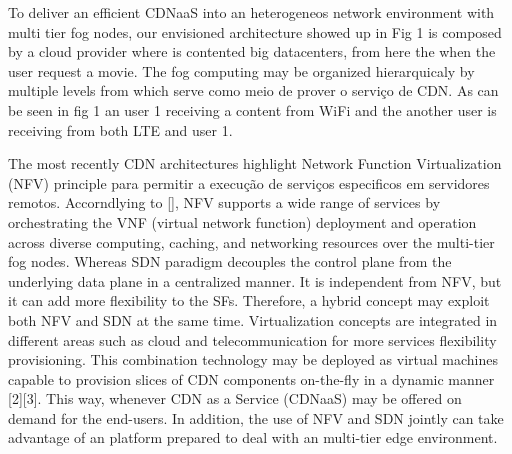 To deliver an efficient CDNaaS into an heterogeneos network environment with multi tier fog nodes, our envisioned architecture showed up in Fig 1 is composed by a cloud provider where is contented big datacenters, from here the when the user request a movie. The fog computing may be organized hierarquicaly by multiple levels from which serve como meio de prover o serviço de CDN. As can be seen in fig 1 an user 1 receiving a content from WiFi and the another user is receiving from both LTE and user 1.

The most recently CDN architectures highlight Network Function Virtualization (NFV) principle para permitir a execução de serviços especificos em servidores remotos. Accorndlying to [], NFV supports a wide range of services by orchestrating the VNF (virtual network function) deployment and operation across diverse computing, caching, and networking resources over the multi-tier fog nodes. Whereas SDN  paradigm decouples the control plane from the underlying data plane in a centralized manner. It is independent from NFV, but it can add more flexibility to the SFs. Therefore, a  hybrid  concept  may  exploit  both  NFV  and  SDN  at  the same  time.  Virtualization  concepts  are  integrated  in  different areas such as cloud and telecommunication for more services flexibility provisioning. This combination technology may be deployed as virtual machines capable to provision slices of CDN components on-the-fly in a dynamic manner [2][3]. This way, whenever CDN as a Service (CDNaaS) may be offered on demand for the end-users. In addition, the use of NFV and SDN jointly can take advantage of an platform prepared to deal with an multi-tier edge environment. %


